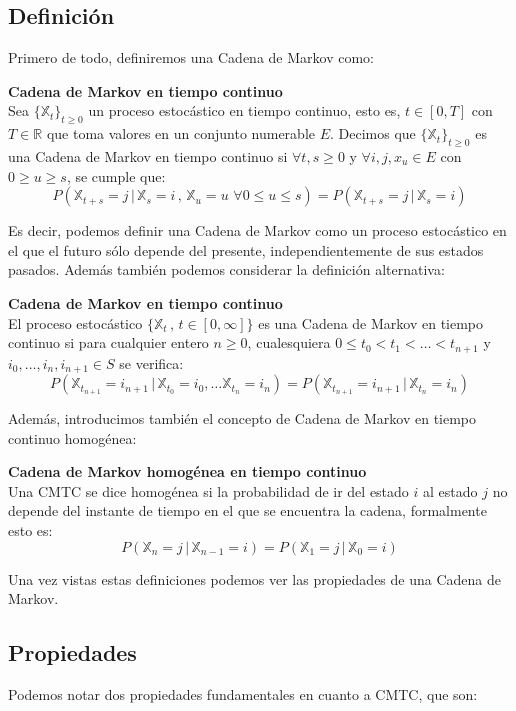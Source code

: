 \documentclass[12pt,a4paper]{article}
\begin{document}
\subsection{Definición}
Primero de todo, definiremos una Cadena de Markov como:
\begin{definition}{\textbf{Cadena de Markov en tiempo continuo}}\\
Sea $\{\mathbb{X}_t\}_{t\geq 0}$ un proceso estocástico en tiempo continuo, esto es, $t\in [0,T]$ con $T\in \mathbb{R}$ que toma valores en un conjunto numerable $E$. Decimos que $\{\mathbb{X}_t\}_{t\geq 0}$ es una Cadena de Markov en tiempo continuo si $\forall t,s\geq 0$ y $\forall i,j,x_u\in E$ con $0\geq u \geq s$, se cumple que:
$$P(\mathbb{X}_{t+s}=j \, | \, \mathbb{X}_s =i \, , \,  \mathbb{X}_u =  u \,\, \forall 0\leq u\leq s)=P(\mathbb{X}_{t+s}=j \, | \, \mathbb{X}_s = i)$$
\end{definition}
Es decir, podemos definir una Cadena de Markov como un proceso estocástico	en el que el futuro sólo depende del presente, independientemente de sus estados pasados. Además también podemos considerar la definición alternativa:
\begin{definition}{\textbf{Cadena de Markov en tiempo continuo}}\\
El proceso estocástico $\{\mathbb{X}_t \, , \, t\in [0,\infty]\}$ es una Cadena de Markov en tiempo continuo si para cualquier entero $n\geq 0$, cualesquiera $0\leq t_0 < t_1 < \ldots < t_{n+1}$ y $i_0,\ldots , i_n,i_{n+1}\in S$ se verifica:
$$P(\mathbb{X}_{t_{n+1}}=i_{n+1}\, | \, \mathbb{X}_{t_0}=i_0 , \ldots \mathbb{X}_{t_n}=i_n)=P(\mathbb{X}_{t_{n+1}}=i_{n+1}\, | \, \mathbb{X}_{t_n}=i_n)$$
\end{definition}
Además, introducimos también el concepto de Cadena de Markov en tiempo continuo homogénea:
\begin{definition}{\textbf{Cadena de Markov homogénea en tiempo continuo}}\\
Una CMTC se dice homogénea si la probabilidad de ir del estado $i$ al estado $j$ no depende del instante de tiempo en el que se encuentra la cadena, formalmente esto es:
$$P(\mathbb{X}_n=j \, | \, \mathbb{X}_{n-1}=i)=P(\mathbb{X}_1=j \, | \, \mathbb{X}_0=i)$$
\end{definition}
Una vez vistas estas definiciones podemos ver las propiedades de una Cadena de Markov.
\subsection{Propiedades}
Podemos notar dos propiedades fundamentales en cuanto a CMTC, que son:
\end{document}
